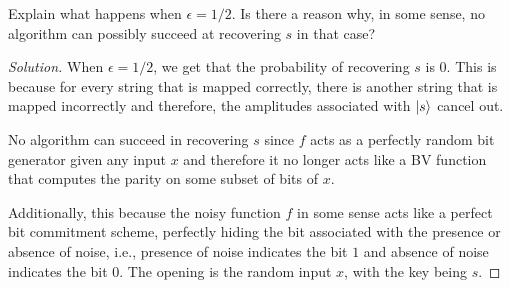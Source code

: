 \begin{solution}[label=ques:4b]
  \begin{question}
    Explain what happens when $\epsilon=1/2$. Is there a
reason why, in some
sense, no algorithm can possibly succeed at
recovering $s$ in that case?
  \end{question}
  \tcblower{}
  \begin{proof}[Solution]
    When $\epsilon = 1/2$, we get that the probability of recovering $s$ is $0$. This is because for every string that is mapped correctly, there is another string that is mapped incorrectly and therefore, the amplitudes associated with $\ket{s}$ cancel out.\par
    No algorithm can succeed in recovering $s$ since $f$ acts as a perfectly random bit generator given any input $x$ and therefore it no longer acts like a BV function that computes the parity on some subset of bits of $x$.\par
    Additionally, this because the noisy function $f$ in some sense acts like a perfect bit commitment scheme, perfectly hiding the bit associated with the presence or absence of noise, i.e., presence of noise indicates the bit $1$ and absence of noise indicates the bit $0$. The opening is the random input $x$, with the key being $s$.
  \end{proof}
\end{solution}
